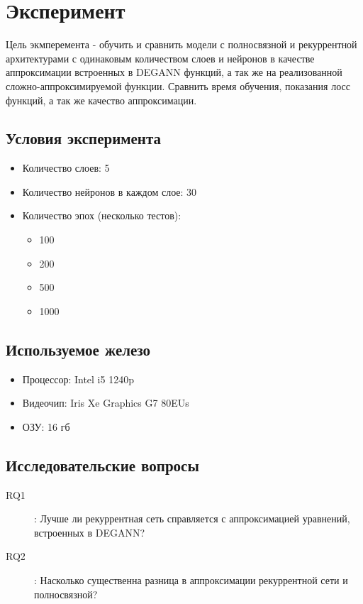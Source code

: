 
\section{Эксперимент}
Цель экмперемента - обучить и сравнить модели с полносвязной и рекуррентной архитектурами с одинаковым количеством слоев и нейронов в качестве аппроксимации встроенных в DEGANN функций, а так же на реализованной сложно-аппроксимируемой функции. Сравнить время обучения, показания лосс функций, а так же качество аппроксимации.

\subsection{Условия эксперимента}
\begin{itemize}
    \item Количество слоев: 5
    \item Количество нейронов в каждом слое: 30
    \item Количество эпох (несколько тестов):
    \begin{itemize}
        \item 100
        \item 200
        \item 500
        \item 1000
    \end{itemize}
\end{itemize}
\subsection{Используемое железо}
\begin{itemize}
    \item Процессор: Intel i5 1240p
    \item Видеочип: Iris Xe Graphics G7 80EUs
    \item ОЗУ: 16 гб
\end{itemize}

\subsection{Исследовательские вопросы}
\begin{description}
    \item[RQ1]: Лучше ли рекуррентная  сеть справляется с аппроксимацией уравнений, встроенных в DEGANN?
    \item[RQ2]: Насколько существенна разница в аппроксимации рекуррентной  сети и полносвязной?
\end{description}

